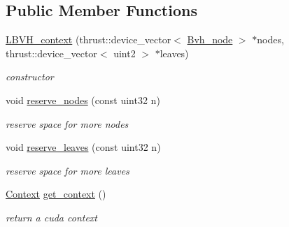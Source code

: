 \subsection*{\-Public \-Member \-Functions}
\begin{DoxyCompactItemize}
\item 
\hypertarget{structnih_1_1cuda_1_1_l_b_v_h__context_a43f6c8c15ef0959a308ff72c7a01b44d}{
\hyperlink{structnih_1_1cuda_1_1_l_b_v_h__context_a43f6c8c15ef0959a308ff72c7a01b44d}{\-L\-B\-V\-H\-\_\-context} (thrust\-::device\-\_\-vector$<$ \hyperlink{structnih_1_1_bvh__node}{\-Bvh\-\_\-node} $>$ $\ast$nodes, thrust\-::device\-\_\-vector$<$ uint2 $>$ $\ast$leaves)}
\label{structnih_1_1cuda_1_1_l_b_v_h__context_a43f6c8c15ef0959a308ff72c7a01b44d}

\begin{DoxyCompactList}\small\item\em constructor \end{DoxyCompactList}\item 
\hypertarget{structnih_1_1cuda_1_1_l_b_v_h__context_a993469fba3b80c21b6aad7f7c2eea4ac}{
void \hyperlink{structnih_1_1cuda_1_1_l_b_v_h__context_a993469fba3b80c21b6aad7f7c2eea4ac}{reserve\-\_\-nodes} (const uint32 n)}
\label{structnih_1_1cuda_1_1_l_b_v_h__context_a993469fba3b80c21b6aad7f7c2eea4ac}

\begin{DoxyCompactList}\small\item\em reserve space for more nodes \end{DoxyCompactList}\item 
\hypertarget{structnih_1_1cuda_1_1_l_b_v_h__context_a3524d8d9d8962af68f91705d9c8df7dd}{
void \hyperlink{structnih_1_1cuda_1_1_l_b_v_h__context_a3524d8d9d8962af68f91705d9c8df7dd}{reserve\-\_\-leaves} (const uint32 n)}
\label{structnih_1_1cuda_1_1_l_b_v_h__context_a3524d8d9d8962af68f91705d9c8df7dd}

\begin{DoxyCompactList}\small\item\em reserve space for more leaves \end{DoxyCompactList}\item 
\hypertarget{structnih_1_1cuda_1_1_l_b_v_h__context_a9e5beb3abb75cf8e0f0b3a1202a29aea}{
\hyperlink{structnih_1_1cuda_1_1_l_b_v_h__context_1_1_context}{\-Context} \hyperlink{structnih_1_1cuda_1_1_l_b_v_h__context_a9e5beb3abb75cf8e0f0b3a1202a29aea}{get\-\_\-context} ()}
\label{structnih_1_1cuda_1_1_l_b_v_h__context_a9e5beb3abb75cf8e0f0b3a1202a29aea}

\begin{DoxyCompactList}\small\item\em return a cuda context \end{DoxyCompactList}\end{DoxyCompactItemize}
